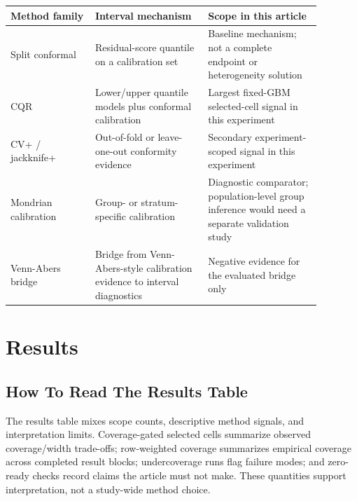 \documentclass[11pt]{article}
\begin{document}
\begingroup
\footnotesize
\setlength{\tabcolsep}{2pt}
\renewcommand{\arraystretch}{1.18}
\begin{tabular}{@{}>{\RaggedRight\arraybackslash}p{0.240\linewidth}>{\RaggedRight\arraybackslash}p{0.320\linewidth}>{\RaggedRight\arraybackslash}p{0.320\linewidth}@{}}
\toprule
Method family & Interval mechanism & Scope in this article \\
\midrule
Split conformal & Residual-score quantile on a calibration set & Baseline mechanism; not a complete endpoint or heterogeneity solution \\
CQR & Lower/upper quantile models plus conformal calibration & Largest fixed-GBM selected-cell signal in this experiment \\
CV+ / jackknife+ & Out-of-fold or leave-one-out conformity evidence & Secondary experiment-scoped signal in this experiment \\
Mondrian calibration & Group- or stratum-specific calibration & Diagnostic comparator; population-level group inference would need a separate validation study \\
Venn-Abers bridge & Bridge from Venn-Abers-style calibration evidence to interval diagnostics & Negative evidence for the evaluated bridge only \\
\bottomrule
\end{tabular}
\endgroup

\section{Results}

\subsection{How To Read The Results Table}

The results table mixes scope counts, descriptive method signals, and interpretation limits. Coverage-gated selected cells summarize observed coverage/width trade-offs; row-weighted coverage summarizes empirical coverage across completed result blocks; undercoverage runs flag failure modes; and zero-ready checks record claims the article must not make. These quantities support interpretation, not a study-wide method choice.
\end{document}
